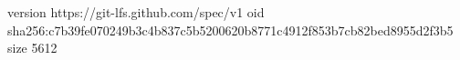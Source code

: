 version https://git-lfs.github.com/spec/v1
oid sha256:c7b39fe070249b3c4b837c5b5200620b8771c4912f853b7cb82bed8955d2f3b5
size 5612
